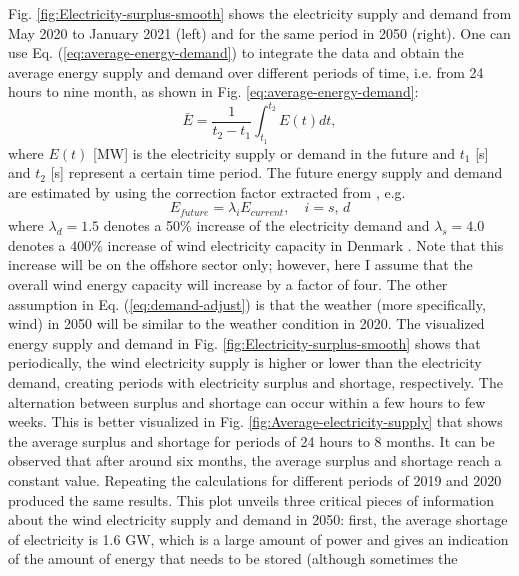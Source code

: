 \documentclass{ECOS_2021}
\begin{document}
Fig. \ref{fig:Electricity-surplus-smooth} shows the electricity supply
and demand from May 2020 to January 2021 (left) and for the same period
in 2050 (right). One can use Eq. (\ref{eq:average-energy-demand})
to integrate the data and obtain the average energy supply and demand
over different periods of time, i.e. from 24 hours to nine month,
as shown in Fig. \ref{eq:average-energy-demand}:
\begin{equation}
\bar{E}=\frac{1}{t_{2}-t_{1}}\int_{t_{1}}^{t_{2}}E\left(t\right)dt,\label{eq:average-energy-demand}
\end{equation}
where $E(t)$ {[}MW{]} is the electricity supply or demand in the
future and $t_{1}$ {[}s{]} and $t_{2}$ {[}s{]} represent a certain
time period. The future energy supply and demand are estimated by
using the correction factor extracted from \cite{eftekhariQuantifyingRoleLiquid2020},
e.g.
\begin{equation}
E_{future}=\lambda_{i}E_{current},\quad i=s,\,d\label{eq:demand-adjust}
\end{equation}
where $\lambda_{d}=1.5$ denotes a 50\% increase of the electricity demand \cite{eftekhariQuantifyingRoleLiquid2020}
and $\lambda_{s}=4.0$ denotes a 400\% increase of wind electricity capacity
in Denmark \cite{danishenergyagencyEnergyIslands2021,dandreaSynergiesOffshoreEnergy2021}.
Note that this increase will be on the offshore sector only; however,
here I assume that the overall wind energy capacity will increase
by a factor of four. The other assumption in Eq. (\ref{eq:demand-adjust})
is that the weather (more specifically, wind) in 2050 will be similar
to the weather condition in 2020. The visualized energy supply and
demand in Fig. \ref{fig:Electricity-surplus-smooth} shows that periodically,
the wind electricity supply is higher or lower than the electricity
demand, creating periods with electricity surplus and shortage, respectively.
The alternation between surplus and shortage can occur within a few
hours to few weeks. This is better visualized in Fig. \ref{fig:Average-electricity-supply}
that shows the average surplus and shortage for periods of 24 hours
to 8 months. It can be observed that after around six months, the
average surplus and shortage reach a constant value. Repeating the calculations 
for different periods of 2019 and 2020 produced the same results. This plot unveils
three critical pieces of information about the wind electricity supply
and demand in 2050: first, the average shortage of electricity is
1.6 GW, which is a large amount of power and gives an indication of
the amount of energy that needs to be stored (although sometimes the
\end{document}

